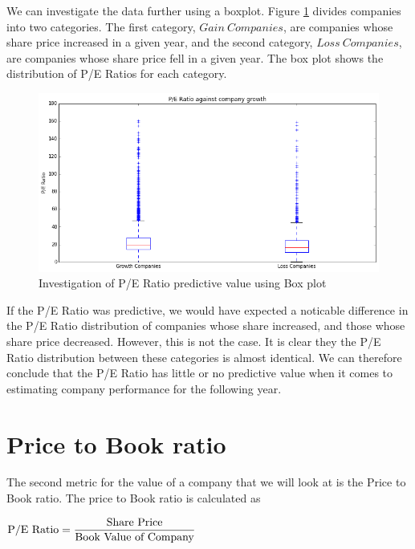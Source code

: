 \documentclass{report}
\begin{document}
We can investigate the data further using a boxplot. Figure \ref{fig:pe-box} divides companies into two categories. The first category, $Gain\ Companies$, are companies whose share price increased in a given year, and the second category, $Loss\ Companies$, are companies whose share price fell in a given year. The box plot shows the distribution of P/E Ratios for each category.

\begin{figure}[H]
	\caption{Investigation of P/E Ratio predictive value using Box plot}
	\centerline{\includegraphics[width=\textwidth]{vis/pe_box.png}}
	\label{fig:pe-box}
\end{figure}

If the P/E Ratio was predictive, we would have expected a noticable difference in the P/E Ratio distribution of companies whose share increased, and those whose share price decreased. However, this is not the case. It is clear they the P/E Ratio distribution between these categories is almost identical. We can therefore conclude that the P/E Ratio has little or no predictive value when it comes to estimating company performance for the following year.

\section{Price to Book ratio}

The second metric for the value of a company that we will look at is the Price to Book ratio. The price to Book ratio is calculated as

\begin{math}
  \\
	\text{P/E Ratio} = \dfrac{\text{Share Price}}{\text{Book Value of Company}}
	\\
\end{math}
\end{document}
